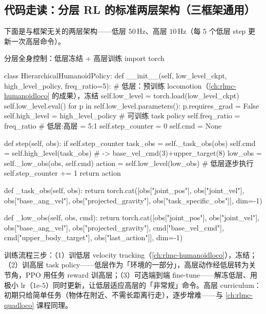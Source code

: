 \subsection{代码走读：分层 RL 的标准两层架构（三框架通用）}
下面是与框架无关的两层架构——低层 $50$\,Hz、高层 $10$\,Hz（每 $5$ 个低层 step 更新一次高层命令）。

\begin{codebox}[Python]{分层全身控制：低层冻结 + 高层训练}
import torch

class HierarchicalHumanoidPolicy:
    def __init__(self, low_level_ckpt, high_level_policy, freq_ratio=5):
        # 低层：预训练 locomotion（\cref{ch:rlmc-humanoidloco} 的成果），冻结
        self.low_level = torch.load(low_level_ckpt)
        self.low_level.eval()
        for p in self.low_level.parameters():
            p.requires_grad = False
        self.high_level = high_level_policy        # 可训练 task policy
        self.freq_ratio = freq_ratio               # 低层:高层 = 5:1
        self.step_counter = 0
        self.cmd = None

    def step(self, obs):
        if self.step_counter %
            task_obs = self._task_obs(obs)
            self.cmd = self.high_level(task_obs)            # -> base_vel_cmd(3)+upper_target(8)
        low_obs = self._low_obs(obs, self.cmd)
        action = self.low_level(low_obs)                    # 低层逐步执行
        self.step_counter += 1
        return action

    def _task_obs(self, obs):
        return torch.cat([obs["joint_pos"], obs["joint_vel"], obs["base_ang_vel"],
                          obs["projected_gravity"], obs["task_specific_obs"]], dim=-1)

    def _low_obs(self, obs, cmd):
        return torch.cat([obs["joint_pos"], obs["joint_vel"], obs["base_ang_vel"],
                          obs["projected_gravity"], cmd["base_vel_cmd"],
                          cmd["upper_body_target"], obs["last_action"]], dim=-1)
\end{codebox}

训练流程三步：（1）训低层 velocity tracking（\cref{ch:rlmc-humanoidloco}），冻结；（2）训高层 task policy——低层作为「环境的一部分」，高层动作经低层转为关节角，PPO 用任务 reward 训高层；（3）可选端到端 fine-tune——解冻低层、用极小 lr（$1\text{e-}5$）同时更新，让低层适应高层的「非常规」命令。高层 curriculum：初期只给简单任务（物体在附近、不需长距离行走），逐步增难——与 \cref{ch:rlmc-quadloco} 课程同理。

